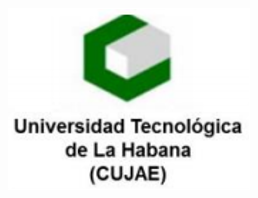 \documentclass[12pt,letterpaper]{article}
\begin{document}
    \begin{figure}[t]
        \includegraphics{fig/logo}
        \centering
    \end{figure}

    \maketitle
    \thispagestyle{empty}
    \linespread{1.5}
    \renewcommand{\tablename}{Tabla}
\end{document}
